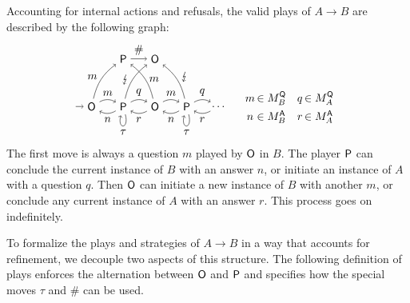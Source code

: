 Accounting for internal actions and refusals,
the valid plays of $A \rightarrow B$
are described by the following graph:
\[
  \begin{tikzpicture}[baseline=(O1.base)]
    \node (O1) at (0,0) {\kw{O}};
    \node (P1) at (1,0) {\kw{P}};
    \node (O2) at (2,0) {\kw{O}};
    \node (P2) at (3,0) {\kw{P}};
    \node (O3) at (4,0) {$\ldots$};
    \node (R) at (1,1.5) {\kw{P}};
    \node (H) at (2,1.5) {\kw{O}};
    \path [->] (R) edge node[auto] {$\#$} (H);
    \path [->] (-0.5,0) edge (O1);
    \path [->] (O1) edge[bend left] node[auto] {$m$} (P1);
    \path [->] (O1) edge[bend left=20] node[auto,anchor=base east] {$m$} (R);
    \path [->] (P1) edge[bend left] node[auto] {$n$} (O1);
    \path [->] (P1) edge[bend left] node[auto] {$q$} (O2);
    \path [->] (P1) edge[loop below] node[auto] {$\tau$} (P1);
    \path [->] (P1) edge[bend left=20] node[auto,anchor=east] {$\lightning$} (H);
    \path [->] (O2) edge[bend left] node[auto] {$r$} (P1);
    \path [->] (O2) edge[bend left] node[auto] {$m$} (P2);
    \path [->] (O2) edge[bend right=20] node[auto,anchor=west] {$m$} (R);
    \path [->] (P2) edge[bend left] node[auto] {$n$} (O2);
    \path [->] (P2) edge[bend left] node[auto] {$q$} (O3);
    \path [->] (P2) edge[loop below] node[auto] {$\tau$} (P2);
    \path [->] (P2) edge[bend right=20] node[anchor=base west] {$\lightning$} (H);
    \path [->] (O3) edge[bend left] node[auto] {$r$} (P2);
  \end{tikzpicture}
  \quad
  \begin{array}{c@{\,}lc@{\,}l}
    m &\in M_B^\kw{Q} & q &\in M_A^\kw{Q} \\[1ex]
    n &\in M_B^\kw{A} & r &\in M_A^\kw{A}
  \end{array}
\]
The first move is always a question $m$ played by $ \mathsf{O} $ in $B$.
The player $ \mathsf{P} $ can conclude the current instance of $B$
with an answer $n$, or
initiate an instance of $A$
with a question $q$.
Then $ \mathsf{O} $ can initiate a new instance of $B$
with another $m$, or
conclude any current instance of $A$
with an answer $r$.
This process goes on indefinitely.

To formalize the plays and strategies of $A \rightarrow B$
in a way that accounts for refinement,
we decouple two aspects of this structure.
The following definition of plays
enforces the alternation between $ \mathsf{O} $ and $ \mathsf{P} $
and specifies how the special moves $\tau$ and $\#$ can be used.

